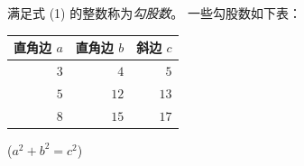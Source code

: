 \documentclass[UTF8]{ctexart}
\begin{document}
        满足式 (1) 的整数称为\emph{勾股数}。
        一些勾股数如下表：\\[3pt]

        \begin{table}[ht]                               %
            \begin{tabular}{|rrr|}
                \hline
                直角边 $a$ & 直角边 $b$ & 斜边 $c$\\
                \hline
                $3$ & $4$ & $5$ \\
                \hline
                $5$ & $12$ & $13$ \\
                \hline
                $8$ & $15$ & $17$ \\
                \hline
            \end{tabular}
            \qquad
            ($a^2 + b^2 = c^2$)
        \end{table}

    
    
\end{document}
